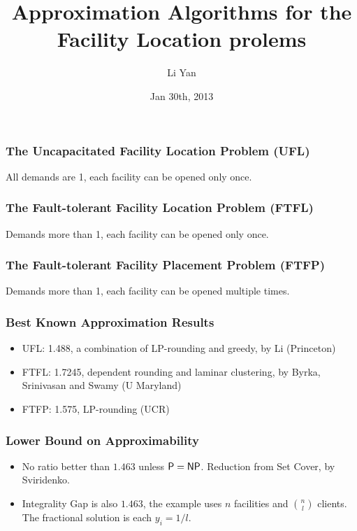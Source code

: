 \documentclass[hyperref, xcolor=dvipsnames]{beamer}
\title[Thesis Proposal Defense]{Approximation Algorithms for the
  Facility Location prolems}
\author[lyan]{Li Yan}
\institute[UCR]{
  Computer Science\\
  University of California Riverside\\
  [\medskipamount]
  \texttt{[image: figure/UCseal.eps]}
}
\date{Jan 30th, 2013}
\begin{document}
\begin{frame}
  \titlepage
\end{frame}

\begin{frame}
  \frametitle{The Uncapacitated Facility Location Problem (UFL)}
  All demands are 1, each facility can be opened only once.
\end{frame}

\begin{frame}
  \frametitle{The Fault-tolerant Facility Location Problem (FTFL)}
  Demands more than 1, each facility can be opened only once.
\end{frame}

\begin{frame}
  \frametitle{The Fault-tolerant Facility Placement Problem (FTFP)}
  Demands more than 1, each facility can be opened multiple times.
\end{frame}

\begin{frame}
  \frametitle{Best Known Approximation Results}
  \begin{itemize}
  \item UFL: 1.488, a combination of LP-rounding and greedy, by Li (Princeton)
  \item FTFL: 1.7245, dependent rounding and laminar clustering, by Byrka, Srinivasan and Swamy (U Maryland)
  \item FTFP: 1.575, LP-rounding (UCR)
  \end{itemize}
\end{frame}

\begin{frame}
  \frametitle{Lower Bound on Approximability}
  \begin{itemize}
  \item No ratio better than $1.463$ unless ${\mbox{\sf P}} = {\mbox{\sf NP}}$. Reduction
    from Set Cover, by Sviridenko.
  \item Integrality Gap is also $1.463$, the example uses $n$ facilities and $n \choose l$ clients. The fractional solution is each $y_i = 1/l$.
  \end{itemize}
\end{frame}
\end{document}
